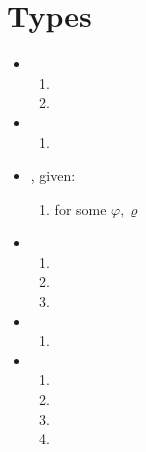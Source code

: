 \section{Types}

\begin{itemize}
    \item {}
    \begin{enumerate}
        \item {}
        \item {}
    \end{enumerate}
    \item {}
    \begin{enumerate}
        \item {}
    \end{enumerate}
    \item {}, given:
    \begin{enumerate}
        \item {} for some $\varphi, \varrho$
    \end{enumerate}
        \item {}
         \begin{enumerate}
        \item {}
        \item \isPot{\varphi}
        \item {}
        \end{enumerate}
        \item {}
        \begin{enumerate}
            \item {}
        \end{enumerate}

    \item {}
\begin{enumerate}
    \item {}
    \item {}
    \item {}
    \item {}
\end{enumerate}


\end{itemize}
